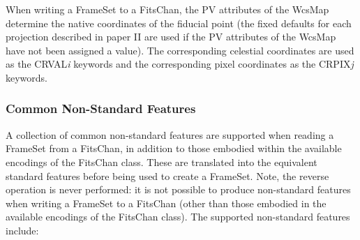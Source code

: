 \documentclass[twoside,11pt]{starlink}
\begin{document}
When writing a FrameSet to a FitsChan, the PV attributes of the WcsMap
determine the native coordinates of the fiducial point (the fixed
defaults for each projection described in paper II are used if the PV
attributes of the WcsMap have not been assigned a value). The
corresponding celestial coordinates are used as the CRVAL\emph{i}
keywords and the corresponding pixel coordinates as the CRPIX\emph{j}
keywords.

\subsubsection{Common Non-Standard Features}
A collection of common non-standard features are supported when reading a
FrameSet from a FitsChan, in addition
to those embodied within the
available encodings of the FitsChan class. These are translated into the
equivalent standard features before being used to create a FrameSet.
Note, the reverse operation is never performed: it is not possible to
produce non-standard features when writing a FrameSet to a FitsChan
(other than those embodied in the available encodings of the FitsChan
class). The supported non-standard features include:
\end{document}
